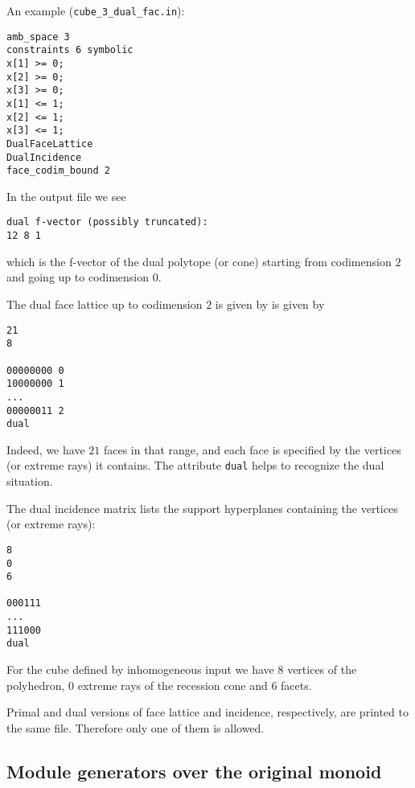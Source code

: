 \documentclass[12pt,a4paper]{scrartcl}
\theoremstyle{definition}
\begin{document}
An example (\verb|cube_3_dual_fac.in|):
\begin{Verbatim}
amb_space 3
constraints 6 symbolic
x[1] >= 0;
x[2] >= 0;
x[3] >= 0;
x[1] <= 1;
x[2] <= 1;
x[3] <= 1;
DualFaceLattice
DualIncidence
face_codim_bound 2
\end{Verbatim}

In the output file we see
\begin{Verbatim}
dual f-vector (possibly truncated):
12 8 1
\end{Verbatim}
which is the f-vector of the dual polytope (or cone) starting from codimension $2$ and going up to codimension $0$.

The dual face lattice up to codimension $2$ is given by is given by
\begin{Verbatim}
21
8

00000000 0
10000000 1
...
00000011 2
dual
\end{Verbatim}
Indeed, we have $21$ faces in that range, and each face is specified by the vertices (or extreme rays) it contains. The attribute \verb|dual| helps to recognize the dual situation.

The dual incidence matrix lists the support hyperplanes containing the vertices (or extreme rays):
\begin{Verbatim}
8
0
6

000111
...
111000
dual
\end{Verbatim}
For the cube defined by inhomogeneous input we have $8$ vertices of the polyhedron, $0$ extreme rays of the recession cone and $6$ facets.

Primal and dual versions of face lattice and incidence, respectively, are printed to the same file. Therefore only one of them is allowed.

\subsection{Module generators over the original monoid}\label{MinMod}
\end{document}
